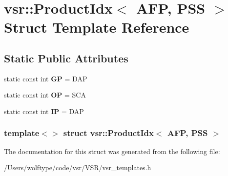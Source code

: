 \hypertarget{structvsr_1_1_product_idx_3_01_a_f_p_00_01_p_s_s_01_4}{\section{vsr\-:\-:Product\-Idx$<$ A\-F\-P, P\-S\-S $>$ Struct Template Reference}
\label{structvsr_1_1_product_idx_3_01_a_f_p_00_01_p_s_s_01_4}
}
\subsection*{Static Public Attributes}
\begin{DoxyCompactItemize}
\item 
\hypertarget{structvsr_1_1_product_idx_3_01_a_f_p_00_01_p_s_s_01_4_a5d34843e2a7ecdc0323fb281a9f2f66f}{static const int {\bfseries G\-P} = D\-A\-P}\label{structvsr_1_1_product_idx_3_01_a_f_p_00_01_p_s_s_01_4_a5d34843e2a7ecdc0323fb281a9f2f66f}

\item 
\hypertarget{structvsr_1_1_product_idx_3_01_a_f_p_00_01_p_s_s_01_4_a9c6e2225354edd5bfb4e4932c288a993}{static const int {\bfseries O\-P} = S\-C\-A}\label{structvsr_1_1_product_idx_3_01_a_f_p_00_01_p_s_s_01_4_a9c6e2225354edd5bfb4e4932c288a993}

\item 
\hypertarget{structvsr_1_1_product_idx_3_01_a_f_p_00_01_p_s_s_01_4_a00e22e1706584ec4b993d0ece9751d6f}{static const int {\bfseries I\-P} = D\-A\-P}\label{structvsr_1_1_product_idx_3_01_a_f_p_00_01_p_s_s_01_4_a00e22e1706584ec4b993d0ece9751d6f}

\end{DoxyCompactItemize}
\subsubsection*{template$<$$>$ struct vsr\-::\-Product\-Idx$<$ A\-F\-P, P\-S\-S $>$}



The documentation for this struct was generated from the following file\-:\begin{DoxyCompactItemize}
\item 
/\-Users/wolftype/code/vsr/\-V\-S\-R/vsr\-\_\-templates.\-h\end{DoxyCompactItemize}

